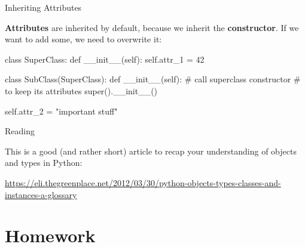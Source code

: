 \begin{frame}[fragile]{Inheriting Attributes}

    {\bf Attributes} are inherited by default, because we inherit the {\bf constructor}. If we want to add some, we need to overwrite it:

    \vspace{0.7em}

    \begin{pythoncode}
class SuperClass:
    def __init__(self):
        self.attr_1 = 42

class SubClass(SuperClass):
    def __init__(self):
        # call superclass constructor
        # to keep its attributes
        super().__init__()

        self.attr_2 = "important stuff"
    \end{pythoncode}

\end{frame}

\begin{frame}{Reading}

    This is a good (and rather short) article to recap your understanding of objects and types in Python:

    \vspace{1em}

    \url{https://eli.thegreenplace.net/2012/03/30/python-objects-types-classes-and-instances-a-glossary}

\end{frame}

\section{Homework}

\begin{frame}[plain]
    \sectionpage
\end{frame}



